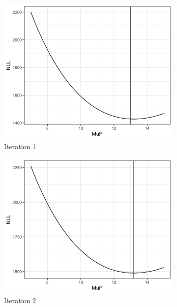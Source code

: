 \documentclass[11pt]{article}
\begin{document}
\begin{figure}[H]
  \centering
    \begin{subfigure}[b]{0.45\textwidth}
      \includegraphics[width=\textwidth]{../../../output/figures/Optimization/opt_data_0.png}
      \caption{Iteration 1}
      \label{fig:f1}
    \end{subfigure}
    \hfill
    \begin{subfigure}[b]{0.45\textwidth}
      \includegraphics[width=\textwidth]{../../../output/figures/Optimization/opt_data_1.png}
      \caption{Iteration 2}

    \end{subfigure}
    \begin{subfigure}[b]{0.45\textwidth}


\end{subfigure}
\end{figure}
\end{document}
